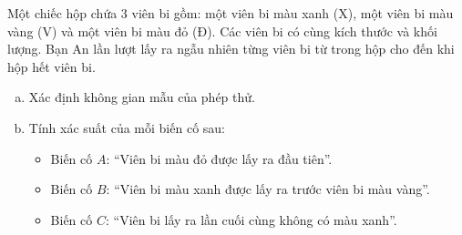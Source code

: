 

\begin{bt}%
Một chiếc hộp chứa 3 viên bi gồm: một viên bi màu xanh (X), một viên bi màu vàng (V) và một viên bi màu đỏ (Đ). Các viên bi có cùng kích thước và khối lượng. Bạn An lần lượt lấy ra ngẫu nhiên từng viên bi từ trong hộp cho đến khi hộp hết viên bi.
\begin{enumerate}[a)]
	\item Xác định không gian mẫu của phép thử.
	\item Tính xác suất của mỗi biến cố sau:
	\begin{itemize}
		\item Biến cố $A$: ``Viên bi màu đỏ được lấy ra đầu tiên''.
		\item Biến cố $B$: ``Viên bi màu xanh được lấy ra trước viên bi màu vàng''.
		\item Biến cố $C$: ``Viên bi lấy ra lần cuối cùng không có màu xanh''.
	\end{itemize}
\end{enumerate}
\end{bt}
